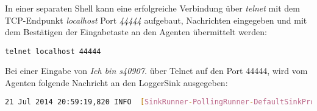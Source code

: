 In einer separaten Shell kann eine erfolgreiche Verbindung über \textit{telnet} mit dem TCP-Endpunkt \textit{localhost} Port \textit{44444} aufgebaut, Nachrichten eingegeben und mit dem Bestätigen der Eingabetaste an den Agenten übermittelt werden:
\begin{verbatim}
telnet localhost 44444
\end{verbatim}

Bei einer Eingabe von \textit{Ich bin s40907.} über Telnet auf den Port 44444, wird vom Agenten folgende Nachricht an den LoggerSink ausgegeben:

\begin{lstlisting}[language=BASH, label=lst:flumeLoggerSink, caption=Apache Flume Ausgabe LoggerSink]
21 Jul 2014 20:59:19,820 INFO  [SinkRunner-PollingRunner-DefaultSinkProcessor] (org.apache.flume.sink.LoggerSink.process:70)  - Event: { headers:{} body: 49 63 68 20 62 69 6E 20 73 34 30 39 30 37 0D    Ich bin s40907. }
\end{lstlisting}